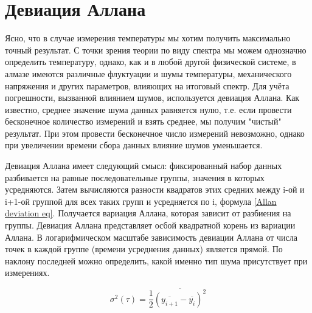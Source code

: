 \section{Девиация Аллана}
Ясно, что в случае измерения температуры мы хотим получить максимально точный результат.
С точки зрения теории по виду спектра мы можем однозначно определить температуру, однако,
как и в любой другой физической системе, в алмазе имеются различные флуктуации и шумы 
температуры, механического напряжения и других параметров, влияющих на итоговый спектр.
Для учёта погрешности, вызванной влиянием шумов, используется девиация Аллана. 
Как известно, среднее значение шума данных равняется нулю, т.е. если провести 
бесконечное количество измерений и взять среднее, мы получим "чистый" результат.
При этом провести бесконечное число измерений невозможно, однако при увеличении
времени сбора данных влияние шумов уменьшается. 

Девиация Аллана имеет следующий смысл: фиксированный набор данных разбивается на равные
последовательные группы, значения в которых усредняются. Затем вычисляются разности квадратов 
этих средних между i-ой и i+1-ой группой для всех таких групп и усредняется по i,
формула \ref{Allan deviation eq}.
Получается вариация Аллана, которая зависит от разбиения на группы. Девиация Аллана 
представляет осбой квадратной корень из вариации Аллана. В логарифмическом масштабе
зависимость девиации Аллана от числа точек в каждой группе (времени усреднения данных)
является прямой. По наклону последней можно определить, какой именно тип шума присутствует
при измерениях.

\begin{equation}
    \label{Allan deviation eq}
    \sigma^2(\tau) = \frac{1}{2}\overline{\left(\overline{y_{i+1}}
    -\overline{y_{i}}\right)^2}
\end{equation}
